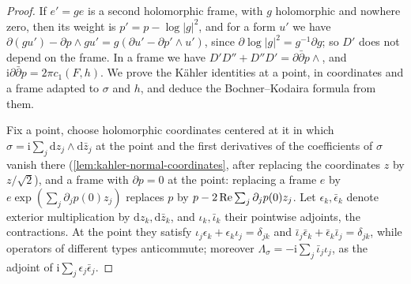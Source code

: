 \begin{proof}
If $e'=ge$ is a second holomorphic frame, with $g$ holomorphic and nowhere zero, then its weight is $p'=p-\log|g|^2$, and for a form $u'$ we have $\partial(gu')-\partial p\wedge gu'=g(\partial u'-\partial p'\wedge u')$, since $\partial\log|g|^2=g^{-1}\partial g$; so $D'$ does not depend on the frame. In a frame we have $D'D''+D''D'=\partial\bar\partial p\wedge$, and $\mathrm i\partial\bar\partial p=2\pi c_1(F,h)$. We prove the K\"ahler identities at a point, in coordinates and a frame adapted to $\sigma$ and $h$, and deduce the Bochner--Kodaira formula from them.

Fix a point, choose holomorphic coordinates centered at it in which $\sigma=\mathrm i\sum_j\mathrm dz_j\wedge\mathrm d\bar z_j$ at the point and the first derivatives of the coefficients of $\sigma$ vanish there (\cref{lem:kahler-normal-coordinates}, after replacing the coordinates $z$ by $z/\sqrt2$), and a frame with $\partial p=0$ at the point: replacing a frame $e$ by $e\exp(\sum_j\partial_jp(0)z_j)$ replaces $p$ by $p-2\operatorname{Re}\sum_j\partial_jp(0)z_j$. Let $\epsilon_k,\bar\epsilon_k$ denote exterior multiplication by $\mathrm dz_k,\mathrm d\bar z_k$, and $\iota_k,\bar\iota_k$ their pointwise adjoints, the contractions. At the point they satisfy $\iota_j\epsilon_k+\epsilon_k\iota_j=\delta_{jk}$ and $\bar\iota_j\bar\epsilon_k+\bar\epsilon_k\bar\iota_j=\delta_{jk}$, while operators of different types anticommute; moreover $\Lambda_\sigma=-\mathrm i\sum_j\bar\iota_j\iota_j$, as the adjoint of $\mathrm i\sum_j\epsilon_j\bar\epsilon_j$.


\end{proof}
